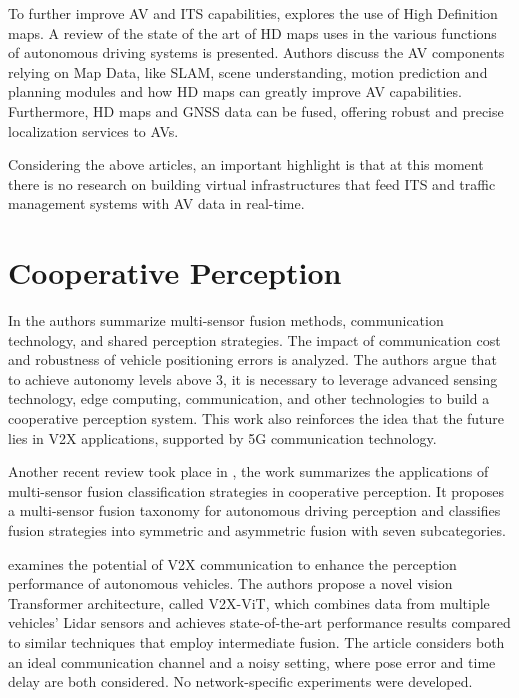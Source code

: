 To further improve AV and ITS capabilities, \cite{elghazaly2023high} explores the use of High Definition maps. A review of the state of the art of HD maps uses in the various functions of autonomous driving systems is presented. Authors discuss the AV components relying on Map Data, like SLAM, scene understanding, motion prediction and planning modules and how HD maps can greatly improve AV capabilities. Furthermore, HD maps and GNSS data can be fused, offering robust and precise localization services to AVs.

Considering the above articles, an important highlight is that at this moment there is no research on building virtual infrastructures that feed ITS and traffic management systems with AV data in real-time.

\section{Cooperative Perception}


In \cite{s22155535} the authors summarize multi-sensor fusion methods, communication technology, and shared perception strategies. The impact of communication cost and robustness of vehicle positioning errors is analyzed. The authors argue that to achieve autonomy levels above 3, it is necessary to leverage advanced sensing technology, edge computing, communication, and other technologies to build a cooperative perception system. This work also reinforces the idea that the future lies in V2X applications, supported by 5G communication technology.

Another recent review took place in \cite{10208208}, the work summarizes the applications of multi-sensor fusion classification strategies in cooperative perception. It proposes a multi-sensor fusion taxonomy for autonomous driving perception and classifies fusion strategies into symmetric and asymmetric fusion with seven subcategories.

\cite{xu2022v2xvit} examines the potential of V2X communication to enhance the perception performance of autonomous vehicles. The authors propose a novel vision Transformer architecture, called V2X-ViT, which combines data from multiple vehicles' Lidar sensors and achieves state-of-the-art performance results compared to similar techniques that employ intermediate fusion. The article considers both an ideal communication channel and a noisy setting, where pose error and time delay are both considered. No network-specific experiments were developed.

